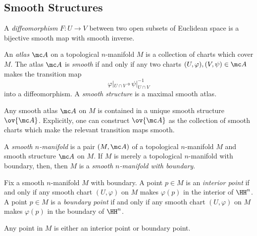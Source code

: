 \documentclass{article}
\begin{document}
\subsection{Smooth Structures}
\begin{definition}[diffeomorphism]
	A \textit{diffeomorphism} $F\colon U\to V$ between two open subsets of Euclidean space is a bijective smooth map with smooth inverse.
\end{definition}
\begin{definition}
	An \textit{atlas} $\mc A$ on a topological $n$-manifold $M$ is a collection of charts which cover $M$. The atlas $\mc A$ is \textit{smooth} if and only if any two charts $(U,\varphi),(V,\psi)\in\mc A$ makes the transition map
	\[\varphi|_{U\cap V}\circ\psi|_{U\cap V}^{-1}\]
	into a diffeomorphism. A \textit{smooth structure} is a maximal smooth atlas.
\end{definition}
\begin{remark}
	Any smooth atlas $\mc A$ on $M$ is contained in a unique smooth structure $\ov{\mc A}$. Explicitly, one can construct $\ov{\mc A}$ as the collection of smooth charts which make the relevant transition maps smooth.
\end{remark}
\begin{definition}
	A \textit{smooth $n$-manifold} is a pair $(M,\mc A)$ of a topological $n$-manifold $M$ and smooth structure $\mc A$ on $M$. If $M$ is merely a topological $n$-manifold with boundary, then, then $M$ is a \textit{smooth $n$-manifold with boundary}.
\end{definition}
\begin{definition}
	Fix a smooth $n$-manifold $M$ with boundary. A point $p\in M$ is an \textit{interior point} if and only if any smooth chart $(U,\varphi)$ on $M$ makes $\varphi(p)$ in the interior of $\HH^n$. A point $p\in M$ is a \textit{boundary point} if and only if any smooth chart $(U,\varphi)$ on $M$ makes $\varphi(p)$ in the boundary of $\HH^n$.
\end{definition}
\begin{remark}
	Any point in $M$ is either an interior point or boundary point.
\end{remark}
\end{document}
